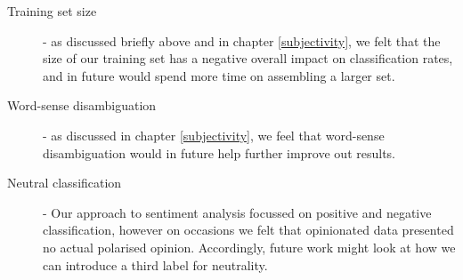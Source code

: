 \begin{description}
	\item [Training set size] - as discussed briefly above and in chapter \ref{subjectivity}, we felt that the size of our training set has a negative overall impact on classification rates, and in future would spend more time on assembling a larger set.
	\item [Word-sense disambiguation] - as discussed in chapter \ref{subjectivity}, we feel that word-sense disambiguation would in future help further improve out results.
	\item [Neutral classification] - Our approach to sentiment analysis focussed on positive and negative classification, however on occasions we felt that opinionated data presented no actual polarised opinion. Accordingly, future work might look at how we can introduce a third label for neutrality.
\end{description}

